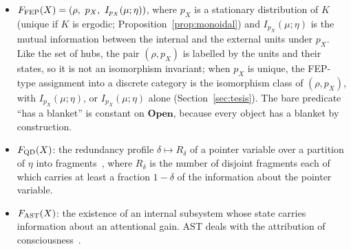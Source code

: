 \begin{itemize}
\item $F_{\rm FEP}(X)=(\rho,\ p_X,\ I_{p_X}(\mu;\eta))$, where $p_X$ is a stationary distribution of $K$ (unique if $K$ is ergodic; Proposition~\ref{prop:monoidal}) and $I_{p_X}(\mu;\eta)$ is the mutual information between the internal and the external units under $p_X$. Like the set of hubs, the pair $(\rho,p_X)$ is labelled by the units and their states, so it is not an isomorphism invariant; when $p_X$ is unique, the FEP-type assignment into a discrete category is the isomorphism class of $(\rho,p_X)$, with $I_{p_X}(\mu;\eta)$, or $I_{p_X}(\mu;\eta)$ alone (Section~\ref{sec:tesis}). The bare predicate ``has a blanket'' is constant on $\mathbf{Open}$, because every object has a blanket by construction.
\item $F_{\rm QD}(X)$: the redundancy profile $\delta\mapsto R_\delta$ of a pointer variable over a partition of $\eta$ into fragments~\cite{Zurek2009}, where $R_\delta$ is the number of disjoint fragments each of which carries at least a fraction $1-\delta$ of the information about the pointer variable.
\item $F_{\rm AST}(X)$: the existence of an internal subsystem whose state carries information about an attentional gain. AST deals with the attribution of consciousness~\cite{GrazianoKastner2011}.
\end{itemize}

